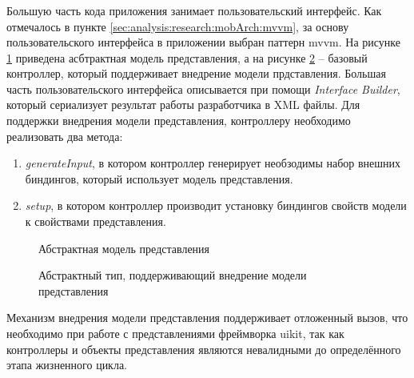 \subsubsection{}
\label{sec:development:client:vc}

Большую часть кода приложения занимает пользовательский интерфейс. Как отмечалось в пункте \ref{sec:analysis:research:mobArch:mvvm}, за основу пользовательского интерфейса в приложении выбран паттерн \gls{mvvm}. 
На рисунке \ref{sec:development:client:vc:code:vm} приведена асбтрактная модель представления, а на рисунке \ref{sec:development:client:vc:code:vc} -- базовый контроллер, который поддерживает внедрение модели прдставления. Большая часть пользовательского интерфейса описывается при помощи \textit{Interface Builder}, который сериализует результат работы разработчика в XML файлы. Для поддержки внедрения модели представления, контроллеру необходимо реализовать два метода: 
\begin{enumerate}
	\item \textit{generateInput}, в котором контроллер генерирует необзодимы набор внешних биндингов, который использует модель представления.
	\item \textit{setup}, в котором контроллер производит установку биндингов свойств модели к свойствами представления.
\end{enumerate}

\begin{figure}[h]
	
   \caption{Абстрактная модель представления}
   \label{sec:development:client:vc:code:vm}
\end{figure}

\begin{figure}[h]
	
   \caption{Абстрактный тип, поддерживающий внедрение модели представления}
   \label{sec:development:client:vc:code:vc}
\end{figure}

Механизм внедрения модели представления поддерживает отложенный вызов, что необходимо при работе с представлениями фреймворка \gls{uikit}, так как контроллеры и объекты представления являются невалидными до определённого этапа жизненного цикла.